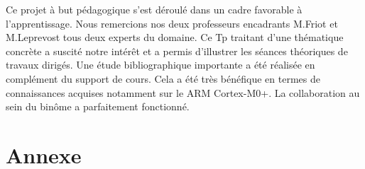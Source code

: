 \documentclass[a4paper]{article}
\begin{document}
Ce projet à but pédagogique s'est déroulé dans un cadre favorable à l'apprentissage. Nous remercions nos  deux professeurs encadrants M.Friot et M.Leprevost tous deux experts du domaine. Ce Tp traitant d’une thématique concrète a suscité notre intérêt et a permis d'illustrer les séances théoriques de travaux dirigés. Une étude bibliographique importante a été réalisée en complément du support de cours. Cela a été très bénéfique en termes de connaissances acquises notamment sur le ARM Cortex-M0+. La collaboration au sein du binôme a parfaitement fonctionné.


  
	{}
	
	
	\newpage
	
	\section{Annexe}
	
\end{document}
